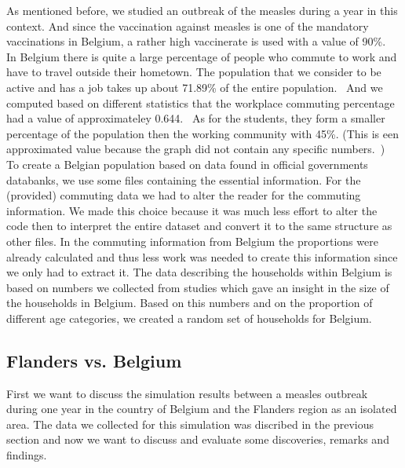 \documentclass[runningheads]{llncs}
\begin{document}
	As mentioned before, we studied an outbreak of the measles during a year in this context. And since the vaccination against measles is one of the mandatory vaccinations in Belgium, a rather high vaccinerate is used with a value of 90\%. ~\cite{ref_url_vaccine} In Belgium there is quite a large percentage of people who commute to work and have to travel outside their hometown. The population that we consider to be active and has a job takes up about 71.89\% of the entire population.~\cite{ref_work_bel} And we computed based on different statistics that the workplace commuting percentage had a value of approximateley 0.644.~\cite{ref_url_commute_work} As for the students, they form a smaller percentage of the population then the working community with 45\%. (This is een approximated value because the graph did not contain any specific numbers.~\cite{pdf_education_BE})\\
	
	To create a Belgian population based on data found in official governments databanks, we use some files containing the essential information. For the (provided) commuting data we had to alter the reader for the commuting information. We made this choice because it was much less effort to alter the code then to interpret the entire dataset and convert it to the same structure as other files. In the commuting information from Belgium the proportions were already calculated and thus less work was needed to create this information since we only had to extract it. The data describing the households within Belgium is based on numbers we collected from studies which gave an insight in the size of the households in Belgium. Based on this numbers and on the proportion of different age categories, we created a random set of households for Belgium. ~\cite{ref_url_hh} ~\cite{ref_url_ages}
	
	\subsection{Flanders vs. Belgium}
	
	First we want to discuss the simulation results between a measles outbreak during one year in the country of Belgium and the Flanders region as an isolated area. The data we collected for this simulation was discribed in the previous section and now we want to discuss and evaluate some discoveries, remarks and findings. \\
	
\end{document}
